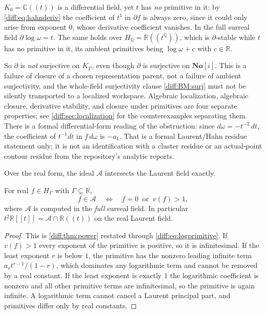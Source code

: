 \documentclass[11pt,letterpaper]{article}
\numberwithin{equation}{section}
\theoremstyle{definition}
\theoremstyle{remark}
\newcommand{\SC}{\mathbf{No}[i]}
\newcommand{\R}{\mathbb R}
\newcommand{\C}{\mathbb C}
\newcommand{\Q}{\mathbb Q}
\newcommand{\der}{\partial}
\newcommand{\Acl}{\mathcal A}
\begin{document}
\begin{example}
\label{diff:ex:logmissing}
$K_{0}=\C((t))$ is a differential field, yet $t$ has \emph{no} primitive in
it: by \cref{diff:eq:hahnderiv} the coefficient of $t^{1}$ in $\der f$ is
always zero, since it could only arise from exponent $0$, whose derivative
coefficient vanishes. In the full surreal field $\der\log\omega=t$. The same
holds over $H_{\Q}=\R((t^{\Q}))$, which is $\der$-stable while $t$ has no
primitive in it, its ambient primitives being $\log\omega+c$ with $c\in\R$.
\end{example}

\begin{warning}
\label{diff:warn:diffnotint}
So $\der$ is \emph{not} surjective on $K_{\Gamma}$, even though $\der$ is
surjective on $\SC$. This is a failure of closure of a chosen representation
parent, not a failure of ambient surjectivity, and the whole-field
surjectivity clause \ref{diff:BM:surj} must not be silently transported to a
localized workspace. Algebraic localization, algebraic closure, derivative
stability, and closure under primitives are four separate properties; see
\cref{diff:sec:localization} for the counterexamples separating them. There is
a formal differential-form reading of the obstruction: since
$d\omega=-t^{-2}\,dt$, the coefficient of $t^{-1}dt$ in $f\,d\omega$ is
$-a_{1}$. That is a formal Laurent/Hahn residue statement only; it is not an
identification with a cluster residue or an actual-point contour residue from
the repository's analytic reports.
\end{warning}

Over the real form, the ideal $\Acl$ intersects the Laurent field exactly.

\begin{corollary}
\label{diff:cor:valphase}
For real $f\in H_{\Gamma}$ with $\Gamma\subseteq\R$,
\[
 f\in\Acl
 \quad\Longleftrightarrow\quad
 f=0\ \text{ or }\ v(f)>1,
\]
where $\Acl$ is computed in the \emph{full} surreal field. In particular
$t^{2}\R[[t]]=\Acl\cap\R((t))$ on the real Laurent field.
\end{corollary}
\begin{proof}
This is \cref{diff:thm:power} restated through \cref{diff:eq:logprimitive}. If
$v(f)>1$ every exponent of the primitive is positive, so it is infinitesimal.
If the least exponent $r$ is below $1$, the primitive has the nonzero leading
infinite term $a_{r}t^{r-1}/(1-r)$, which dominates any logarithmic term and
cannot be removed by a real constant. If the least exponent is exactly $1$ the
logarithmic coefficient is nonzero and all other primitive terms are
infinitesimal, so the primitive is again infinite. A logarithmic term cannot
cancel a Laurent principal part, and primitives differ only by real constants.
\end{proof}
\end{document}
